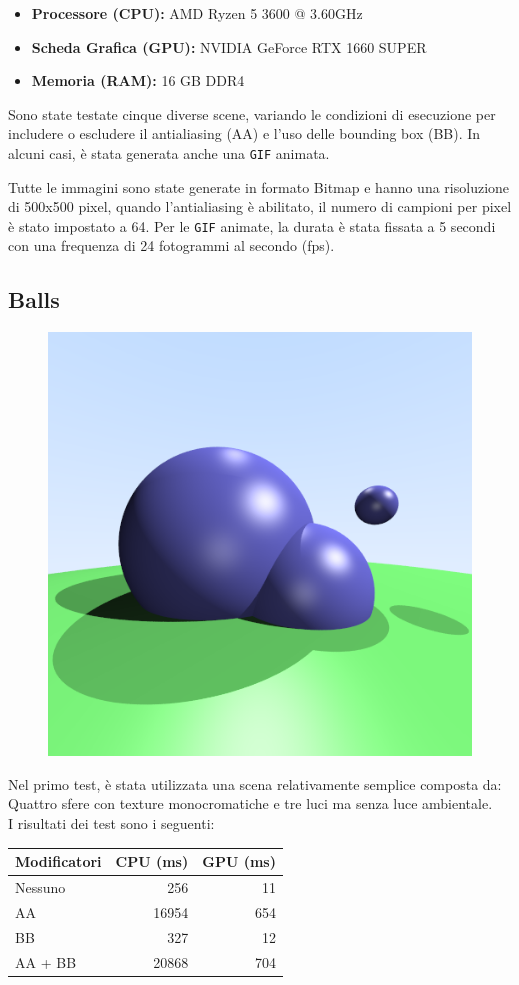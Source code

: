 \documentclass{article}
\begin{document}
\begin{itemize}
    \item \textbf{Processore (CPU):} AMD Ryzen 5 3600 @ 3.60GHz
    \item \textbf{Scheda Grafica (GPU):} NVIDIA GeForce RTX 1660 SUPER
    \item \textbf{Memoria (RAM):} 16 GB DDR4
\end{itemize}

Sono state testate cinque diverse scene, variando le condizioni di esecuzione per includere o escludere il antialiasing (AA) e l'uso delle bounding box (BB). In alcuni casi, è stata generata anche una \texttt{GIF} animata.

Tutte le immagini sono state generate in formato Bitmap e hanno una risoluzione di 500x500 pixel, quando l'antialiasing è abilitato, il numero di campioni per pixel è stato impostato a 64. Per le \texttt{GIF} animate, la durata è stata fissata a 5 secondi con una frequenza di 24 fotogrammi al secondo (fps).
    
\subsection{Balls}

\begin{figure}[H]
    \centering
    \includegraphics[width=0.5\linewidth]{balls.png}
    \label{fig:balls}
\end{figure}

Nel primo test, è stata utilizzata una scena relativamente semplice composta da:
Quattro sfere con texture monocromatiche e tre luci ma senza luce ambientale.\\

I risultati dei test sono i seguenti:

\begin{table}[H]
    \centering
    \begin{tabular}{|l|r|r|}
    \hline
    \textbf{Modificatori} & \textbf{CPU (ms)}   & \textbf{GPU (ms)} \\ \hline
    Nessuno      & 256   & 11  \\ \hline
    AA           & 16954 & 654 \\ \hline
    BB           & 327   & 12  \\ \hline
    AA + BB      & 20868 & 704 \\ \hline
    \end{tabular}
\end{table}
\end{document}
